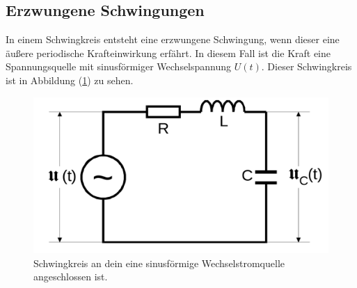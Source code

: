 \subsection{Erzwungene Schwingungen}
In einem Schwingkreis entsteht eine erzwungene Schwingung, wenn dieser eine äußere 
periodische Krafteinwirkung erfährt. In diesem Fall ist die Kraft eine Spannungsquelle
mit sinusförmiger Wechselspannung $U(t)$. Dieser Schwingkreis ist in Abbildung 
(\ref{pic:erzwungene_Schwingung_Schwingkreis}) zu sehen. 

\begin{figure}[H]
    \centering
    \includegraphics[width=0.5\linewidth]{erzwungene_Schwingung_Schwingkreis.png}
    \caption{Schwingkreis an dein eine sinusförmige Wechselstromquelle angeschlossen ist.}
    \label{pic:erzwungene_Schwingung_Schwingkreis}
\end{figure}


